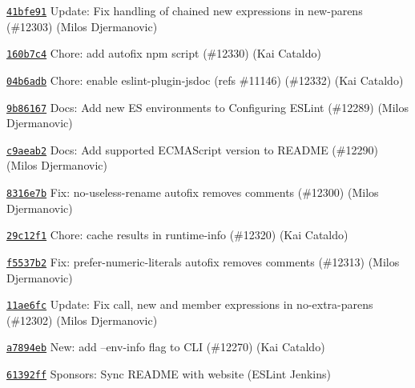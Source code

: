 \begin{DoxyItemize}
\item \href{https://github.com/eslint/eslint/commit/41bfe919c06932b7e58cd9ead20157e06656160a}{\texttt{ {\ttfamily 41bfe91}}} Update\+: Fix handling of chained new expressions in new-\/parens (\#12303) (Milos Djermanovic)
\item \href{https://github.com/eslint/eslint/commit/160b7c46b556ccb6023eb411a8be8801a4bda6df}{\texttt{ {\ttfamily 160b7c4}}} Chore\+: add autofix npm script (\#12330) (Kai Cataldo)
\item \href{https://github.com/eslint/eslint/commit/04b6adb7f1bcb2b6cb3fa377b1ca4cecd810630e}{\texttt{ {\ttfamily 04b6adb}}} Chore\+: enable eslint-\/plugin-\/jsdoc (refs \#11146) (\#12332) (Kai Cataldo)
\item \href{https://github.com/eslint/eslint/commit/9b86167e6f053e4a72bf68ebc79db53903f7f8c3}{\texttt{ {\ttfamily 9b86167}}} Docs\+: Add new ES environments to Configuring E\+S\+Lint (\#12289) (Milos Djermanovic)
\item \href{https://github.com/eslint/eslint/commit/c9aeab21a71c6743f51163b7a8fdf4f0cbfcdbde}{\texttt{ {\ttfamily c9aeab2}}} Docs\+: Add supported E\+C\+M\+A\+Script version to R\+E\+A\+D\+ME (\#12290) (Milos Djermanovic)
\item \href{https://github.com/eslint/eslint/commit/8316e7be5a9429513d7ecf2ee2afc40ab4415b8f}{\texttt{ {\ttfamily 8316e7b}}} Fix\+: no-\/useless-\/rename autofix removes comments (\#12300) (Milos Djermanovic)
\item \href{https://github.com/eslint/eslint/commit/29c12f18726a3afb21fc89ab1bdacc6972d49e68}{\texttt{ {\ttfamily 29c12f1}}} Chore\+: cache results in runtime-\/info (\#12320) (Kai Cataldo)
\item \href{https://github.com/eslint/eslint/commit/f5537b2ed0b0b5e51a34c22cdd4ebfd024eaea3d}{\texttt{ {\ttfamily f5537b2}}} Fix\+: prefer-\/numeric-\/literals autofix removes comments (\#12313) (Milos Djermanovic)
\item \href{https://github.com/eslint/eslint/commit/11ae6fcb5d5503e5dea41c02780369efe51f0bb9}{\texttt{ {\ttfamily 11ae6fc}}} Update\+: Fix call, new and member expressions in no-\/extra-\/parens (\#12302) (Milos Djermanovic)
\item \href{https://github.com/eslint/eslint/commit/a7894ebb43523152d36720efa770bb1fe8b58c07}{\texttt{ {\ttfamily a7894eb}}} New\+: add --env-\/info flag to C\+LI (\#12270) (Kai Cataldo)
\item \href{https://github.com/eslint/eslint/commit/61392ff5ec660bfc01ac2ff0e9660d259cf88fd6}{\texttt{ {\ttfamily 61392ff}}} Sponsors\+: Sync R\+E\+A\+D\+ME with website (E\+S\+Lint Jenkins)

\end{DoxyItemize}
